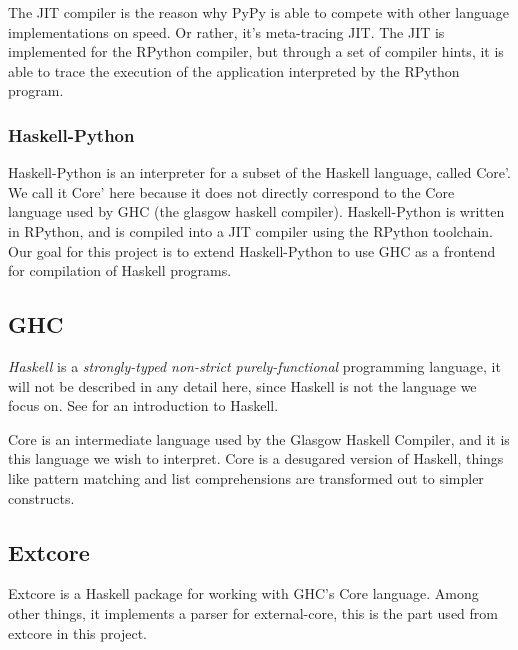 The JIT compiler is the reason why PyPy is able to compete with other language implementations
on speed. Or rather, it's meta-tracing JIT. The JIT is implemented
for the RPython compiler, but through a set of compiler hints, it is able to trace the 
execution of the application interpreted by the RPython program.

\subsubsection{Haskell-Python}

Haskell-Python is an interpreter for a subset of the Haskell language, called Core'.
We call it Core' here because it does not directly correspond to the Core language
used by GHC (the glasgow haskell compiler). Haskell-Python is written in RPython,
and is compiled into a JIT compiler using the RPython toolchain. Our goal for this
project is to extend Haskell-Python to use GHC as a frontend for compilation 
of Haskell programs.

\subsection{GHC}

\emph{Haskell} is a \emph{strongly-typed non-strict purely-functional} 
programming language, it will not be described in any detail here, since 
Haskell is not the language we focus on. See \cite{hudak1992report}
for an introduction to Haskell. 

Core is an intermediate language used by the Glasgow Haskell Compiler\cite{ghc},
and it is this language we wish to interpret. Core is a desugared version of Haskell, 
things like pattern matching
and list comprehensions are transformed out to simpler constructs.\cite{jones1994compilation}

\subsection{Extcore}

Extcore is a Haskell package for working with GHC's Core language. Among other things,
it implements a parser for external-core, this is the part used from extcore in this project.

